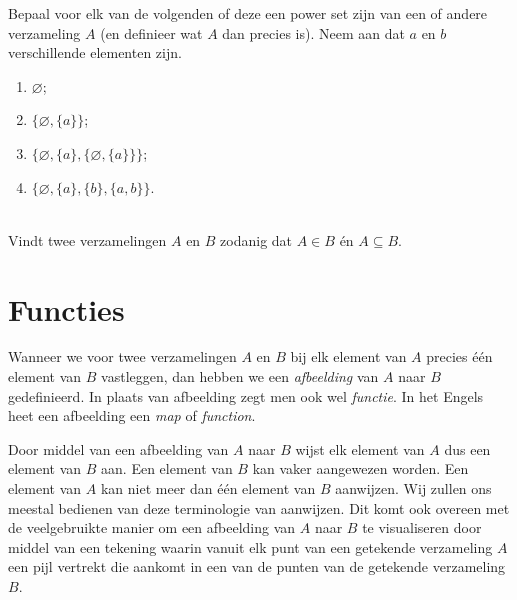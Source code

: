 \begin{exercise} Bepaal voor elk van de volgenden of deze een power set zijn van een of andere verzameling $A$ (en definieer wat $A$ dan precies is). Neem aan dat $a$ en $b$ verschillende elementen zijn.
\begin{enumerate}[label=\textit{\alph*.}]
\item $\varnothing$;
\item $\{\varnothing,\{a\}\}$;
\item $\{\varnothing,\{a\},\{\varnothing,\{a\}\}\}$;
\item $\{\varnothing,\{a\},\{b\},\{a,b\}\}$.
\end{enumerate}
\end{exercise}

\begin{exercise}[Bonus]\mbox{}\\
Vindt twee verzamelingen $A$ en $B$ zodanig dat $A\in B$ \'en $A\subseteq B$.
\end{exercise}

\section{Functies}\label{sec:functies}
Wanneer we voor twee verzamelingen $A$ en $B$ bij elk element van $A$ precies \'e\'en element van $B$ vastleggen, dan hebben we een \textit{afbeelding} van $A$ naar $B$ gedefinieerd. In plaats van afbeelding zegt men ook wel \textit{functie}. In het Engels heet een afbeelding een \textit{map} of \textit{function}.

Door middel van een afbeelding van $A$ naar $B$ wijst elk element van $A$ dus een element van $B$ aan. Een element van $B$ kan vaker aangewezen worden. Een element van $A$ kan niet meer dan \'e\'en element van $B$ aanwijzen. Wij zullen ons meestal bedienen van deze terminologie van aanwijzen. Dit komt ook overeen met de veelgebruikte manier om een afbeelding van $A$ naar $B$ te visualiseren door middel van een tekening waarin vanuit elk punt van een getekende verzameling $A$ een pijl vertrekt die aankomt in een van de punten van de getekende verzameling $B$.
\begin{center}
\end{center}

